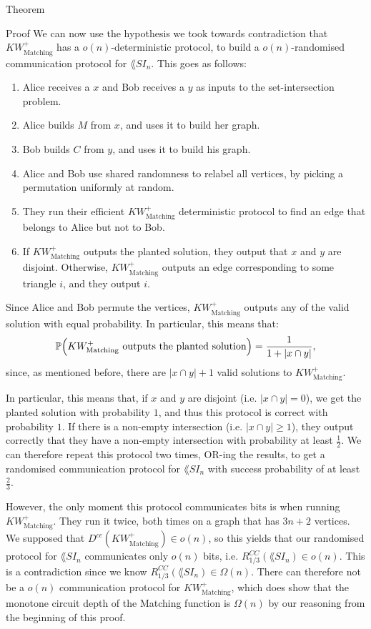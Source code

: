 \documentclass[a4paper]{article}
\begin{document}
\begin{parag}{Theorem}
\begin{subparag}{Proof}
        We can now use the hypothesis we took towards contradiction that $KW_{\text{Matching}}^+$ has a $o\left(n\right)$-deterministic protocol, to build a $o\left(n\right)$-randomised communication protocol for $\lang{SI}_n$. This goes as follows:
        \begin{enumerate}
            \item Alice receives a $x$ and Bob receives a $y$ as inputs to the set-intersection problem.
            \item Alice builds $M$ from $x$, and uses it to build her graph.
            \item Bob builds $C$ from $y$, and uses it to build his graph.
            \item Alice and Bob use shared randomness to relabel all vertices, by picking a permutation uniformly at random.
            \item They run their efficient $KW_{\text{Matching}}^+$ deterministic protocol to find an edge that belongs to Alice but not to Bob.
            \item If $KW_{\text{Matching}}^+$ outputs the planted solution, they output that $x$ and $y$ are disjoint. Otherwise, $KW_{\text{Matching}}^+$ outputs an edge corresponding to some triangle $i$, and they output $i$.
        \end{enumerate}

        Since Alice and Bob permute the vertices, $KW_{\text{Matching}}^+$ outputs any of the valid solution with equal probability. In particular, this means that: 
        \[\prob\left(\text{$KW_{\text{Matching}}^+$ outputs the planted solution}\right) = \frac{1}{1 + \left|x \cap y\right|},\]
        since, as mentioned before, there are $\left|x \cap y\right| + 1$ valid solutions to $KW_{\text{Matching}}^+$.

        In particular, this means that, if $x$ and $y$ are disjoint (i.e. $\left|x \cap y\right| = 0$), we get the planted solution with probability $1$, and thus this protocol is correct with probability $1$. If there is a non-empty intersection (i.e. $\left|x \cap y\right| \geq 1$), they output correctly that they have a non-empty intersection with probability at least $\frac{1}{2}$. We can therefore repeat this protocol two times, OR-ing the results, to get a randomised communication protocol for $\lang{SI}_n$ with success probability of at least $\frac{2}{3}$. 

        However, the only moment this protocol communicates bits is when running $KW_{\text{Matching}}^+$. They run it twice, both times on a graph that has $3n + 2$ vertices. We supposed that $D^{cc}\left(KW_{\text{Matching}}^+\right) \in o\left(n\right)$, so this yields that our randomised protocol for $\lang{SI}_n$ communicates only $o\left(n\right)$ bits, i.e. $R_{1 / 3}^{CC}\left(\lang{SI}_n\right) \in o\left(n\right)$. This is a contradiction since we know $R_{1 / 3}^{CC}\left(\lang{SI}_n\right) \in \Omega\left(n\right)$. There can therefore not be a $o\left(n\right)$ communication protocol for $KW_{\text{Matching}}^+$, which does show that the monotone circuit depth of the Matching function is $\Omega\left(n\right)$ by our reasoning from the beginning of this proof.


\end{subparag}
\end{parag}
\end{document}
